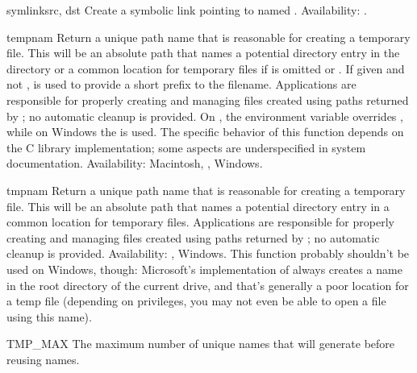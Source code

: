 \begin{funcdesc}{symlink}{src, dst}
Create a symbolic link pointing to  named .
Availability: \UNIX.
\end{funcdesc}

\begin{funcdesc}{tempnam}{}
Return a unique path name that is reasonable for creating a temporary
file.  This will be an absolute path that names a potential directory
entry in the directory  or a common location for temporary
files if  is omitted or .  If given and not
,  is used to provide a short prefix to the
filename.  Applications are responsible for properly creating and
managing files created using paths returned by ;
no automatic cleanup is provided.
On \UNIX, the environment variable  overrides
, while on Windows the  is used.  The specific
behavior of this function depends on the C library implementation;
some aspects are underspecified in system documentation.
  Availability: Macintosh, \UNIX, Windows.
\end{funcdesc}

\begin{funcdesc}{tmpnam}{}
Return a unique path name that is reasonable for creating a temporary
file.  This will be an absolute path that names a potential directory
entry in a common location for temporary files.  Applications are
responsible for properly creating and managing files created using
paths returned by ; no automatic cleanup is
provided.
  Availability: \UNIX, Windows.  This function probably
shouldn't be used on Windows, though: Microsoft's implementation of
 always creates a name in the root directory of the
current drive, and that's generally a poor location for a temp file
(depending on privileges, you may not even be able to open a file
using this name).
\end{funcdesc}

\begin{datadesc}{TMP_MAX}
The maximum number of unique names that  will
generate before reusing names.
\end{datadesc}


